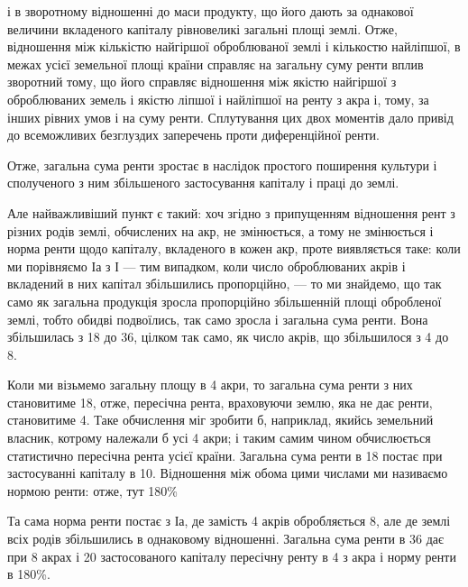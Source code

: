 \parcont{}  %
і в зворотному відношенні до маси продукту, що його дають за однакової величини
вкладеного капіталу рівновеликі загальні площі землі. Отже, відношення між
кількістю найгіршої оброблюваної землі і кількостю найліпшої, в межах усієї
земельної площі країни справляє на загальну суму ренти вплив зворотний
тому, що його справляє відношення між якістю найгіршої з оброблюваних земель
і якістю ліпшої і найліпшої на ренту з акра і, тому, за інших рівних
умов і на суму ренти. Сплутування цих двох моментів дало привід до всеможливих
безглуздих заперечень проти диференційної ренти.

Отже, загальна сума ренти зростає в наслідок простого поширення культури
і сполученого з ним збільшеного застосування капіталу і праці до землі.

Але найважливіший пункт є такий: хоч згідно з припущенням відношення
рент з різних родів землі, обчислених на акр, не змінюється, а тому
не змінюється і норма ренти щодо капіталу, вкладеного в кожен акр, проте
виявляється таке: коли ми порівняємо І$а$ з І — тим випадком, коли число оброблюваних
акрів і вкладений в них капітал збільшились пропорційно, — то ми знайдемо,
що так само як загальна продукція зросла пропорційно збільшенній площі
обробленої землі, тобто обидві подвоїлись, так само зросла і загальна сума ренти.
Вона збільшилась з 18 до 36, цілком так само, як число акрів, що
збільшилося з 4 до 8.

Коли ми візьмемо загальну площу в 4 акри, то загальна сума ренти з них
становитиме 18, отже, пересічна рента, враховуючи землю, яка не дає
ренти, становитиме 4. Таке обчислення міг зробити б, наприклад,
якийсь земельний власник, котрому належали б усі 4 акри; і таким самим
чином обчислюється статистично пересічна рента усієї країни. Загальна сума
ренти в 18 постає при застосуванні капіталу в 10.
Відношення між обома цими числами ми називаємо нормою ренти: отже, тут
180\%

Та сама норма ренти постає з І$а$, де замість 4 акрів обробляється 8,
але де землі всіх родів збільшились в однаковому відношенні. Загальна сума
ренти в 36 дає при 8 акрах і 20 застосованого капіталу
пересічну ренту в 4 з акра і норму ренти в 180\%.


